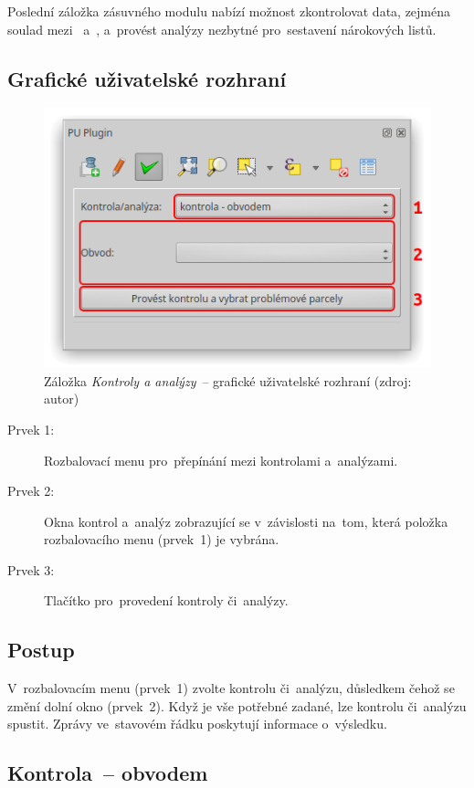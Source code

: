 Poslední záložka zásuvného modulu nabízí možnost zkontrolovat data,
zejména sou\-lad mezi~ a~, a~provést analýzy nezbytné
pro~sestavení nárokových listů.

\subsection{Grafické uživatelské rozhraní}
\label{manual_kontroly_analyzy_gui}

	\begin{figure}[H] \centering
		\includegraphics[width=.55\textwidth]{./pictures/ca_gui.png}
		\caption[Záložka \textit{Kontroly a analýzy}~–
grafické uživatelské rozhraní]{Záložka \textit{Kontroly a analýzy}~–
grafické uživatelské rozhraní (zdroj: autor)}
		\label{fig:manual_ca_gui}
 	\end{figure}

\begin{description}
	\item[Prvek 1:] Rozbalovací menu pro~přepínání mezi kontrolami
a~analýzami.
	\item[Prvek 2:] Okna kontrol a~analýz zobrazující se
v~závislosti na~tom, která položka rozbalovacího menu (prvek~1) je
vybrána.
	\item[Prvek 3:] Tlačítko pro~provedení kontroly či~analýzy.
\end{description}

\subsection{Postup}
\label{manual_kontroly_analyzy_postup}

V~rozbalovacím menu (prvek~1) zvolte kontrolu či~analýzu, důsledkem
čehož se změní dolní okno (prvek~2). Když je vše potřebné zadané, lze
kontrolu či~analýzu spustit. Zprávy ve~stavovém řádku poskytují
informace o~výsledku.

\subsection{Kontrola~– obvodem}
\label{manual_kontrola_obvodem}

